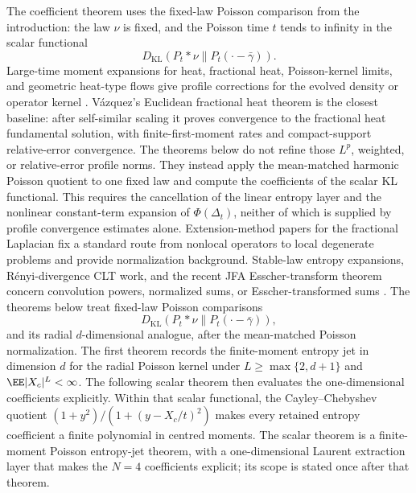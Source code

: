 The coefficient theorem uses the fixed-law Poisson comparison from the
introduction: the law \(\nu\) is fixed, and the Poisson time \(t\) tends to
infinity in the scalar functional
\[
D_{\mathrm{KL}}(P_t*\nu\|P_t(\cdot-\bar{\gamma})).
\]
Large-time moment expansions for heat, fractional heat, Poisson-kernel
limits, and geometric heat-type flows give profile corrections for the
evolved density or operator kernel
\cite{DuoandikoetxeaZuazua1992,EscobedoZuazua1991,KarchSchonbek2001,
Vazquez2018FractionalHeatEuclidean,
Yamamoto2012FractionalExpansion,IshigeKawakami2012,
IshigeKawakamiMichihisa2017,IshigeKawakamiMichihisa2022RefinedFractional,
FilaIshigeKawakami2012PoissonKernel,Iwabuchi2015CriticalBurgersPoisson,
AnkerPapageorgiouZhang2023HeatSymmetricSpaces,
Papageorgiou2024FractionalLargeTime}.
V{\'a}zquez's Euclidean fractional heat theorem is the closest baseline:
after self-similar scaling it proves convergence to the fractional heat
fundamental solution, with finite-first-moment rates and compact-support
relative-error convergence.  The theorems below do not refine those
\(L^p\), weighted, or relative-error profile norms.  They instead apply the
mean-matched harmonic Poisson quotient to one fixed law and compute the
coefficients of the scalar KL functional.  This requires the cancellation of
the linear entropy layer and the nonlinear constant-term expansion of
\(\Phi(\Delta_t)\), neither of which is supplied by profile convergence
estimates alone.
Extension-method papers for the fractional Laplacian
\cite{CaffarelliSilvestre2007,StingaTorrea2010} fix a standard route from
nonlocal operators to local degenerate problems and provide normalization
background.
Stable-law entropy expansions, R\'enyi-divergence CLT work, and the recent
JFA Esscher-transform theorem concern convolution powers, normalized sums, or
Esscher-transformed sums
\cite{BobkovChistyakovGotze2013,BobkovChistyakovGotzeEdgeworth2013,
BobkovChistyakovGotzeBerryEsseen2014,
BobkovGotzeRenyiSurvey2025,BobkovGotzeRenyi2025,
BobkovGotzeEsscher2025}.
The theorems below treat fixed-law Poisson comparisons
\[
D_{\mathrm{KL}}(P_t*\nu\|P_t(\cdot-\bar{\gamma})),
\]
and its radial \(d\)-dimensional analogue, after the mean-matched Poisson
normalization.  The first theorem records the finite-moment entropy jet in
dimension \(d\) for the radial Poisson kernel under
\(L\ge\max\{2,d+1\}\) and \(\EE|X_c|^L<\infty\).  The following scalar theorem
then evaluates the one-dimensional coefficients explicitly.  Within that
scalar functional, the Cayley--Chebyshev quotient
\((1+y^2)/(1+(y-X_c/t)^2)\) makes every retained entropy coefficient a
finite polynomial in centred moments.  The scalar theorem is a finite-moment
Poisson entropy-jet theorem, with a one-dimensional Laurent extraction layer
that makes the \(N=4\) coefficients explicit; its scope is stated once after
that theorem.

